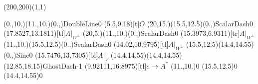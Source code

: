 \unitlength=1bp%

\begin{feynartspicture}(200,200)(1,1)

\FADiagram{}
\FAProp(0.,10.)(11.,10.)(0.,){DoubleLine}{0}
\FALabel(5.5,9.18)[t]{$O$}
\FAProp(20,15.)(15.5,12.5)(0.,){ScalarDash}{0}
\FALabel(17.8527,13.1811)[tl]{$A|_{W^\perp}$}
\FAProp(20,5.)(11.,10.)(0.,){ScalarDash}{0}
\FALabel(15.3973,6.9311)[tr]{$A|_{W^\perp}$}
\FAProp(11.,10.)(15.5,12.5)(0.,){ScalarDash}{0}
\FALabel(14.02,10.9795)[tl]{$A|_{W^\perp}$}
\FAProp(15.5,12.5)(14.4,14.55)(0.,){Sine}{0}
\FALabel(15.7476,13.7305)[bl]{$A|_V$}
\FAProp(14.4,14.55)(14.4,14.55)(12.85,18.15){GhostDash}{-1}
\FALabel(9.92111,16.8975)[tl]{$c\to A^*$}
\FAVert(11.,10.){0}
\FAVert(15.5,12.5){0}
\FAVert(14.4,14.55){0}
\end{feynartspicture}

